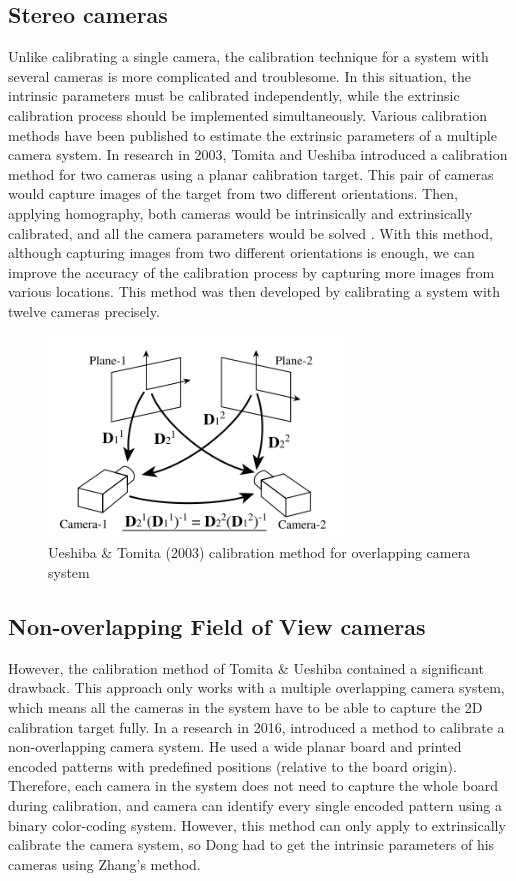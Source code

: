 \subsection{Stereo cameras}
Unlike calibrating a single camera, the calibration technique for a system with several cameras is more complicated and troublesome. In this situation, the intrinsic parameters must be calibrated independently, while the extrinsic calibration process should be implemented simultaneously. Various calibration methods have been published to estimate the extrinsic parameters of a multiple camera system. In research in 2003, Tomita and Ueshiba introduced a calibration method for two cameras using a planar calibration target. This pair of cameras would capture images of the target from two different orientations. Then, applying homography, both cameras would be intrinsically and extrinsically calibrated, and all the camera parameters would be solved \citep{Ueshiba2003}. With this method, although capturing images from two different orientations is enough, we can improve the accuracy of the calibration process by capturing more images from various locations. This method was then developed by calibrating a system with twelve cameras precisely.

\begin{figure}[ht]
\centering
\includegraphics[width=0.7\textwidth]{Images/Tomita.png}
\caption{Ueshiba \& Tomita (2003) calibration method for overlapping camera system}
\end{figure}

\subsection{Non-overlapping Field of View cameras}
However, the calibration method of Tomita \& Ueshiba contained a significant drawback. This approach only works with a multiple overlapping camera system, which means all the cameras in the system have to be able to capture the 2D calibration target fully. In a research in 2016, \cite{Dong2016} introduced a method to calibrate a non-overlapping camera system. He used a wide planar board and printed encoded patterns with predefined positions (relative to the board origin). Therefore, each camera in the system does not need to capture the whole board during calibration, and camera can identify every single encoded pattern using a binary color-coding system. However, this method can only apply to extrinsically calibrate the camera system, so Dong had to get the intrinsic parameters of his cameras using Zhang's method.

